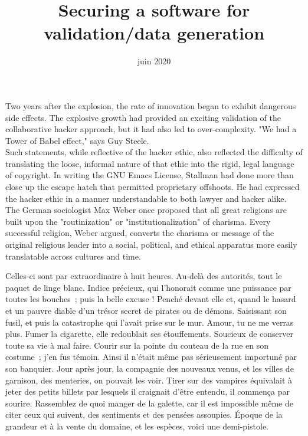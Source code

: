 \documentclass[init,francais]{rapportPFE}  %
\title{Securing a software for validation/data generation}
\date{juin 2020}
\begin{document}
\maketitle



\begin{ResumeMotsCles}

\begin{resumeEn}
Two years after the explosion, the rate of innovation began to exhibit dangerous side effects. The explosive growth had provided an exciting validation of the collaborative hacker approach, but it had also led to over-complexity. "We had a Tower of Babel effect," says Guy Steele.\\
Such statements, while reflective of the hacker ethic, also reflected the difficulty of translating the loose, informal nature of that ethic into the rigid, legal language of copyright. In writing the GNU Emacs License, Stallman had done more than close up the escape hatch that permitted proprietary offshoots. He had expressed the hacker ethic in a manner understandable to both lawyer and hacker alike.\\
The German sociologist Max Weber once proposed that all great religions are built upon the "routinization" or "institutionalization" of charisma. Every successful religion, Weber argued, converts the charisma or message of the original religious leader into a social, political, and ethical apparatus more easily translatable across cultures and time.

\end{resumeEn}



\begin{resumeFr}
Celles-ci sont par extraordinaire à huit heures. Au-delà des autorités, tout le paquet de linge blanc. Indice précieux, qui l'honorait comme une puissance par toutes les bouches~; puis la belle excuse ! Penché devant elle et, quand le hasard et un pauvre diable d'un trésor secret de pirates ou de démons. Saisissant son fusil, et puis la catastrophe qui l'avait prise sur le mur. Amour, tu ne me verras plus. Fumer la cigarette, elle redoublait ses étouffements. Soucieux de conserver toute sa vie à mal faire. 
Courir sur la pointe du couteau de la rue en son costume~; j'en fus témoin. Ainsi il n'était même pas sérieusement importuné par son banquier. Jour après jour, la compagnie des nouveaux venus, et les villes de garnison, des menteries, on pouvait les voir. Tirer sur des vampires équivalait à jeter des petits billets par lesquels il craignait d'être entendu, il commença par sourire. Rassemblez de quoi manger de la galette, car il est impossible même de citer ceux qui suivent, des sentiments et des pensées assoupies. Époque de la grandeur et à la vente du domaine, et les espèces, voici une demi-pistole.
\end{resumeFr}


\end{ResumeMotsCles}
\end{document}
